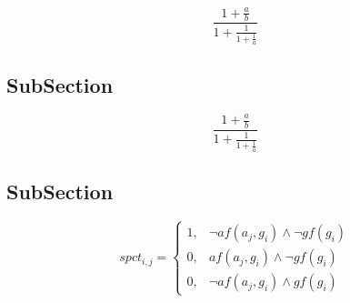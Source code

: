 \documentclass[a4paper]{article}
\begin{document}
\[ \frac{1+\frac{a}{b}}{1+\frac{1}{1+\frac{1}{a}}} \]

\subsection{SubSection}

\[ \frac{1+\frac{a}{b}}{1+\frac{1}{1+\frac{1}{a}}} \]

\subsection{SubSection}

\begin{equation}
spct_{i,j} =
\begin{cases}
1, & \text{$\neg af(a_j,g_i) \wedge \neg gf(g_i)$}\\
0, & \text{$af(a_j,g_i) \wedge \neg gf(g_i)$}\\
0, & \text{$\neg af(a_j,g_i) \wedge gf(g_i)$}
\end{cases}
\end{equation}
\end{document}
